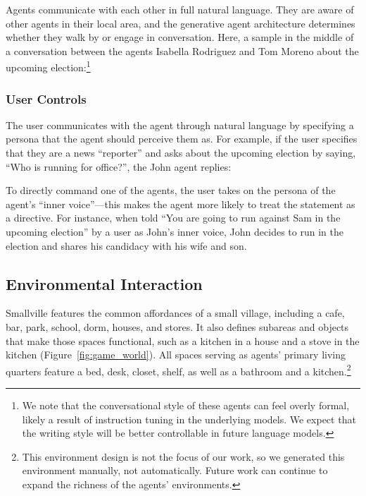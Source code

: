 Agents communicate with each other in full natural language. They are aware of other agents in their local area, and the generative agent architecture determines whether they walk by or engage in conversation. Here, a sample in the middle of a conversation between the agents Isabella Rodriguez and Tom Moreno about the upcoming election:\footnote{We note that the conversational style of these agents can feel overly formal, likely a result of instruction tuning in the underlying models. We expect that the writing style will be better controllable in future language models.}

\begin{quote}

\end{quote}

\subsubsection{User Controls} The user communicates with the agent through natural language by specifying a persona that the agent should perceive them as. For example, if the user specifies that they are a news ``reporter'' and asks about the upcoming election by saying, ``Who is running for office?'', the John agent replies:

\begin{quote}

\end{quote}

To directly command one of the agents, the user takes on the persona of the agent’s ``inner voice''---this makes the agent more likely to treat the statement as a directive. For instance, when told “You are going to run against Sam in the upcoming election” by a user as John's inner voice, John decides to run in the election and shares his candidacy with his wife and son.

\subsection{Environmental Interaction} Smallville features the common affordances of a small village, including a cafe, bar, park, school, dorm, houses, and stores. It also defines subareas and objects that make those spaces functional, such as a kitchen in a house and a stove in the kitchen (Figure~\ref{fig:game_world}). All spaces serving as agents’ primary living quarters feature a bed, desk, closet, shelf, as well as a bathroom and a kitchen.\footnote{This environment design is not the focus of our work, so we generated this environment manually, not automatically. Future work can continue to expand the richness of the agents' environments.}

